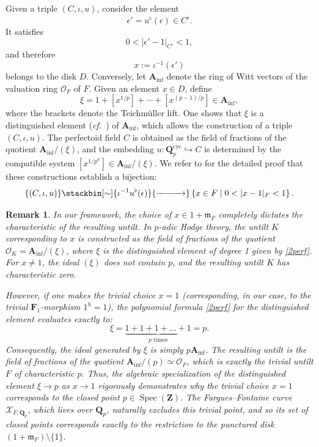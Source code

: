 \documentclass[11pt,a4paper]{article}
\newtheorem{remark}[theorem]{Remark}
\newcommand{\Q}{\mathbf{Q}}
\newcommand{\Z}{\mathbf{Z}}
\newcommand{\Fone}{\mathbf{F}_{1}}
\newcommand{\Spec}{\operatorname{Spec}}
\def\cf{{\it cf.\/}\ }
\begin{document}
Given a triple $(C,\iota,u)$, consider the element
\[
\epsilon'
=
u^\flat(\epsilon)
\in C^\flat.
\]
It satisfies
\[
0<|\epsilon'-1|_{C^\flat}<1,
\]
and therefore
\[
x
:=
\iota^{-1}(\epsilon')
\]
belongs to the disk $D$.
Conversely, let 
$\mathbf A_{\mathrm{inf}}$
denote the ring of Witt vectors of the valuation ring 
$\mathcal O_F$ of $F$. 
Given an element $x\in D$, define
\begin{equation}\label{2perf}
\xi
=
1+[x^{1/p}]
+\cdots+
[x^{(p-1)/p}]
\in \mathbf A_{\mathrm{inf}},
\end{equation}
where the brackets denote the Teichm\"uller lift. 
One shows that $\xi$ is a distinguished element (\cf \cite[Definition 15, Lecture 3]{Lurie}) of 
$\mathbf A_{\mathrm{inf}}$, which allows the construction 
of a triple $(C,\iota,u)$. 
The perfectoid field $C$ is obtained as the field of fractions of the quotient $
\mathbf A_{\mathrm{inf}}/(\xi)$, 
and the embedding $
u:\Q_p^{\mathrm{cyc}}
\hookrightarrow C$ 
is determined by the compatible system $
[x^{1/p^n}]
\in
\mathbf A_{\mathrm{inf}}/(\xi)$.
We refer to \cite[Lecture~8]{Lurie} 
for the detailed proof that these constructions 
establish a bijection:
\[
\{(C,\iota,u)\}
\stackbin[\sim]{\iota^{-1}u^\flat(\epsilon)}{\xrightarrow{\hspace{1cm}}}
\left\{
x\in F
\;\middle|\;
0<|x-1|_F<1
\right\}.
\]

\begin{remark}\label{2perf1}
In our framework, the choice of $x \in 1 + \mathfrak{m}_F$ completely dictates the characteristic of the resulting untilt. In $p$-adic Hodge theory, the untilt $K$ corresponding to $x$ is constructed as the field of fractions of the quotient $\mathcal{O}_K = \mathbf A_{\text{inf}} / (\xi)$, where $\xi$ is the  distinguished element of degree 1 given by \eqref{2perf}. For $x \neq 1$, the ideal $(\xi)$ does not contain $p$, and the resulting untilt $K$ has characteristic zero. 

However, if one makes the trivial choice $x = 1$ (corresponding, in our case, to the trivial $\Fone$-morphism $1^h = 1$), the polynomial formula \eqref{2perf} for the distinguished element evaluates exactly to:
\[
\xi = \underbrace{1 + 1 + 1 + \dots + 1}_{p \text{ times}} = p.
\]
Consequently, the ideal generated by $\xi$ is simply $p \mathbf A_{\text{inf}}$. The resulting untilt is the field of fractions of the quotient $\mathbf A_{\text{inf}} / (p) \simeq \mathcal{O}_F$, which is exactly the trivial untilt $F$ of characteristic $p$. Thus, the algebraic specialization of the distinguished element $\xi \to p$ as $x \to 1$ rigorously demonstrates why the trivial choice $x=1$ corresponds to the closed point $p \in \Spec(\Z)$. The Fargues--Fontaine curve $\mathcal{X}_{F, \Q_p}$, which lives over $\Q_p$, naturally excludes this trivial point, and so its set of closed points corresponds exactly to the restriction to the punctured disk $(1 + \mathfrak{m}_F) \setminus \{1\}$.
\end{remark}
\end{document}
